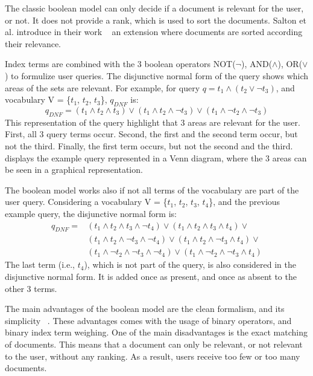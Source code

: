 The classic boolean model can only decide if a document is relevant for the user, or not. It does not provide a rank, which is used to sort the documents. Salton et al. introduce in their work ~\cite{Salton-Extended-1983} an extension where documents are sorted according their relevance.

Index terms are combined with the $3$ boolean operators NOT($\neg$), AND($\wedge$), OR($\vee$) to formulize user queries. The disjunctive normal form of the query shows which areas of the sets are relevant. For example, for query $q=t_1 \wedge (t_2 \vee \neg t_3)$, and vocabulary V = \{$t_1$, $t_2$, $t_3$\}, $q_{DNF}$ is:
\begin{equation}
q_{DNF} = (t_1 \wedge t_2 \wedge t_3) \vee (t_1 \wedge t_2 \wedge \neg t_3) \vee (t_1 \wedge \neg t_2 \wedge \neg t_3)
\end{equation}
This representation of the query highlight that $3$ areas are relevant for the user. First, all $3$ query terms occur. Second, the first and the second term occur, but not the third. Finally, the first term occurs, but not the second and the third.  displays the example query represented in a Venn diagram, where the $3$ areas can be seen in a graphical representation.

The boolean model works also if not all terms of the vocabulary are part of the user query. Considering a vocabulary V = \{$t_1$, $t_2$, $t_3$, $t_4$\}, and the previous example query, the disjunctive normal form is:
\begin{equation}
  \begin{aligned}
    q_{DNF} = &(t_1 \wedge t_2 \wedge t_3 \wedge \neg t_4) \vee (t_1 \wedge t_2 \wedge t_3 \wedge t_4) \vee \\
              &(t_1 \wedge t_2 \wedge \neg t_3 \wedge \neg t_4) \vee (t_1 \wedge t_2 \wedge \neg t_3 \wedge t_4) \vee \\
              &(t_1 \wedge \neg t_2 \wedge \neg t_3 \wedge \neg t_4) \vee (t_1 \wedge \neg t_2 \wedge \neg t_3 \wedge t_4)
  \end{aligned}
\end{equation}
The last term (i.e., $t_4$), which is not part of the query, is also considered in the disjunctive normal form. It is added once as present, and once as absent to the other $3$ terms.

The main advantages of the boolean model are the clean formalism, and its simplicity ~\cite{ModernInvormationRetrieval1999}. These advantages comes with the usage of binary operators, and binary index term weighing. One of the main disadvantages is the exact matching of documents. This means that a document can only be relevant, or not relevant to the user, without any ranking. As a result, users receive too few or too many documents.

